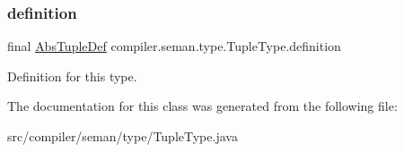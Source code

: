 \subsubsection{\texorpdfstring{definition}{definition}}
{\footnotesize\ttfamily final \hyperlink{classcompiler_1_1abstr_1_1tree_1_1def_1_1_abs_tuple_def}{Abs\+Tuple\+Def} compiler.\+seman.\+type.\+Tuple\+Type.\+definition}

Definition for this type. 

The documentation for this class was generated from the following file\+:\begin{DoxyCompactItemize}
\item 
src/compiler/seman/type/Tuple\+Type.\+java\end{DoxyCompactItemize}
